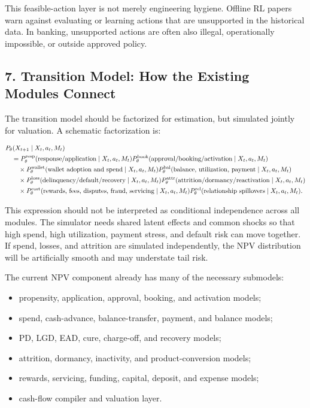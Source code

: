 \documentclass[
]{article}
\providecommand{\tightlist}{%
  \setlength{\itemsep}{0pt}\setlength{\parskip}{0pt}}
\begin{document}
This feasible-action layer is not merely engineering hygiene. Offline RL
papers warn against evaluating or learning actions that are unsupported
in the historical data. In banking, unsupported actions are often also
illegal, operationally impossible, or outside approved policy.

\hypertarget{transition-model-how-the-existing-modules-connect}{%
\subsection{7. Transition Model: How the Existing Modules
Connect}\label{transition-model-how-the-existing-modules-connect}}

The transition model should be factorized for estimation, but simulated
jointly for valuation. A schematic factorization is:

\begin{align}
  &P_{\theta}(X_{t+1}\mid X_t,a_t,M_t) \notag\\
  &\quad =
  P_{\theta}^{\mathrm{resp}}(\text{response/application}\mid X_t,a_t,M_t)
  P_{\theta}^{\mathrm{book}}(\text{approval/booking/activation}\mid X_t,a_t,M_t)
  \notag\\
  &\qquad{}\times
  P_{\theta}^{\mathrm{wallet}}(\text{wallet adoption and spend}\mid X_t,a_t,M_t)
  P_{\theta}^{\mathrm{bal}}(\text{balance, utilization, payment}\mid X_t,a_t,M_t)
  \notag\\
  &\qquad{}\times
  P_{\theta}^{\mathrm{loss}}(\text{delinquency/default/recovery}\mid X_t,a_t,M_t)
  P_{\theta}^{\mathrm{attr}}(\text{attrition/dormancy/reactivation}\mid X_t,a_t,M_t)
  \notag\\
  &\qquad{}\times
  P_{\theta}^{\mathrm{cost}}(\text{rewards, fees, disputes, fraud, servicing}\mid X_t,a_t,M_t)
  P_{\theta}^{\mathrm{rel}}(\text{relationship spillovers}\mid X_t,a_t,M_t).
  \label{eq:transition-factorization}
\end{align}

This expression should not be interpreted as conditional independence
across all modules. The simulator needs shared latent effects and common
shocks so that high spend, high utilization, payment stress, and default
risk can move together. If spend, losses, and attrition are simulated
independently, the NPV distribution will be artificially smooth and may
understate tail risk.

The current NPV component already has many of the necessary submodels:

\begin{itemize}
\tightlist
\item
  propensity, application, approval, booking, and activation models;
\item
  spend, cash-advance, balance-transfer, payment, and balance models;
\item
  PD, LGD, EAD, cure, charge-off, and recovery models;
\item
  attrition, dormancy, inactivity, and product-conversion models;
\item
  rewards, servicing, funding, capital, deposit, and expense models;
\item
  cash-flow compiler and valuation layer.
\end{itemize}
\end{document}
